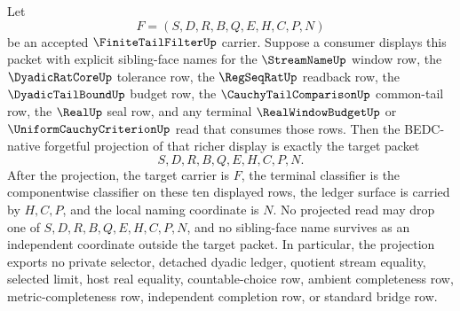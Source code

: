 \begin{theorem}
\label{thm:finite-tail-filter-forgetful-projection-boundary}
Let
$$
F=(S,D,R,B,Q,E,H,C,P,N)
$$
be an accepted $\FiniteTailFilterUp$ carrier. Suppose a consumer displays this packet with explicit sibling-face names for the $\StreamNameUp$ window row, the $\DyadicRatCoreUp$ tolerance row, the $\RegSeqRatUp$ readback row, the $\DyadicTailBoundUp$ budget row, the $\CauchyTailComparisonUp$ common-tail row, the $\RealUp$ seal row, and any terminal $\RealWindowBudgetUp$ or $\UniformCauchyCriterionUp$ read that consumes those rows. Then the BEDC-native forgetful projection of that richer display is exactly the target packet
$$
S,D,R,B,Q,E,H,C,P,N.
$$
After the projection, the target carrier is $F$, the terminal classifier is the componentwise classifier on these ten displayed rows, the ledger surface is carried by $H,C,P$, and the local naming coordinate is $N$. No projected read may drop one of $S,D,R,B,Q,E,H,C,P,N$, and no sibling-face name survives as an independent coordinate outside the target packet. In particular, the projection exports no private selector, detached dyadic ledger, quotient stream equality, selected limit, host real equality, countable-choice row, ambient completeness row, metric-completeness row, independent completion row, or standard bridge row.
\end{theorem}
